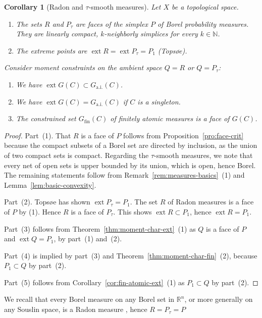 \documentclass[a4paper,11pt,reqno]{amsart}
\numberwithin{equation}{section}
\theoremstyle{plain}
\newtheorem{corollary}[theorem]{Corollary}
\theoremstyle{definition}
\newcommand{\N}{\mathbb{N}} %
\newcommand{\R}{\mathbb{R}} %
\DeclareMathOperator{\ext}{ext} %
\newcommand\ait{\mathrm{a.i.}}
\newcommand\fint{\mathrm{fin}}
\begin{document}
%
\begin{corollary}[Radon and $\tau$-smooth measures]\label{cor:Borel-faces}
Let $X$ be a topological space.
\begin{enumerate}
\item 
The sets $R$ and $P\!_\tau$ are faces of the simplex $P$ of Borel probability measures.
They are linearly compact, $k$-neighborly simplices for every $k\in\N$. 
\item 
The extreme points are $\ext R=\ext P\!_\tau=P_1$ (Tops{\o}e).
\end{enumerate}
Consider moment constraints on the ambient space $Q=R$ or $Q=P\!_\tau$:
\begin{enumerate}
\item[(3)]
We have $\ext G(C)\subset G_\ait(C)$.
\item[(4)] 
We have $\ext G(C)=G_\ait(C)$ if $C$ is a singleton.
\item[(5)]
The constrained set $G_\fint(C)$ of finitely atomic measures is a face of $G(C)$.
\end{enumerate}
\end{corollary}
%
\begin{proof}
Part~(1). That $R$ is a face of $P$ follows from Proposition~\ref{pro:face-crit} because
the compact subsets of a Borel set are directed by inclusion, as the union of two compact 
sets is compact. Regarding the $\tau$-smooth measures, we note that every net of open 
sets is upper bounded by its union, which is open, hence Borel. The remaining statements 
follow from Remark~\ref{rem:measures-basics}~(1) and Lemma~\ref{lem:basic-convexity}.
\par
%
Part~(2). Tops{\o}e \cite[Theorem~11.1]{topsoe70} has shown $\ext P\!_\tau=P_1$.
The set $R$ of Radon measures is a face of $P$ by (1). Hence $R$ is a face of $P_\tau$.
This shows $\ext R\subset P_1$, hence $\ext R=P_1$.
\par
%
Part~(3) follows from Theorem~\ref{thm:moment-char-ext}~(1) as $Q$ is a face of 
$P$ and $\ext Q=P_1$, by part~(1) and~(2).
\par
%
Part~(4) is implied by part~(3) and Theorem~\ref{thm:moment-char-fin}~(2),
because $P_1\subset Q$ by part~(2).
\par
%
Part~(5) follows from Corollary~\ref{cor:fin-atomic-ext}~(1) as $P_1\subset Q$
by part~(2). 
\end{proof}
%
We recall that every Borel measure on any Borel set in $\R^n$, or more generally on any 
Souslin space, is a Radon measure \cite[p.~122]{schwartz73}, hence $R=P\!_\tau=P$ 
\end{document}
